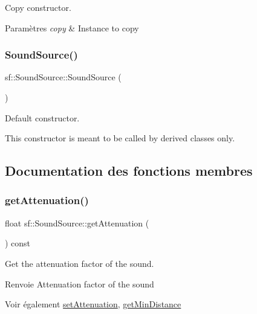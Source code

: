 Copy constructor. 


\begin{DoxyParams}{Paramètres}
{\em copy} & Instance to copy \\
\hline
\end{DoxyParams}
\mbox{\label{classsf_1_1SoundSource_aefa4bd4460f387d81a0637d293979436}} 
\subsubsection{\texorpdfstring{Sound\+Source()}{SoundSource()}\hspace{0.1cm}{\footnotesize\ttfamily [2/2]}}
{\footnotesize\ttfamily sf\+::\+Sound\+Source\+::\+Sound\+Source (\begin{DoxyParamCaption}{ }\end{DoxyParamCaption})\hspace{0.3cm}{\ttfamily [protected]}}



Default constructor. 

This constructor is meant to be called by derived classes only. 

\subsection{Documentation des fonctions membres}
\mbox{\label{classsf_1_1SoundSource_a8ad7dafb4f1b4afbc638cebe24f48cc9}} 
\subsubsection{\texorpdfstring{get\+Attenuation()}{getAttenuation()}}
{\footnotesize\ttfamily float sf\+::\+Sound\+Source\+::get\+Attenuation (\begin{DoxyParamCaption}{ }\end{DoxyParamCaption}) const}



Get the attenuation factor of the sound. 

\begin{DoxyReturn}{Renvoie}
Attenuation factor of the sound
\end{DoxyReturn}
\begin{DoxySeeAlso}{Voir également}
\hyperlink{classsf_1_1SoundSource_aa2adff44cd2f8b4e3c7315d7c2a45626}{set\+Attenuation}, \hyperlink{classsf_1_1SoundSource_a605ca7f359ec1c36fcccdcd4696562ac}{get\+Min\+Distance} 
\end{DoxySeeAlso}
\mbox{\label{classsf_1_1SoundSource_a605ca7f359ec1c36fcccdcd4696562ac}} 

